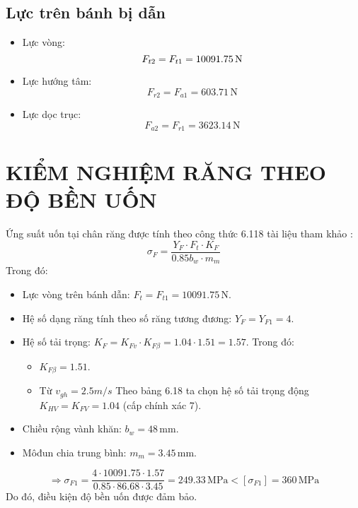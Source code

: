         \subsection{Lực trên bánh bị dẫn}
            \begin{itemize}
                \item Lực vòng: 
                    \begin{equation*}
                        F_{t2} = F_{t1} = 10091.75 \, \mathrm{N} \\
                    \end{equation*}
                \item Lực hướng tâm:
                    \begin{equation*}
                        F_{r2} = F_{a1} = 603.71  \, \mathrm{N}
                    \end{equation*}
                \item Lực dọc trục:
                    \begin{equation*}
                        F_{a2} = F_{r1} = 3623.14 \, \mathrm{N}
                    \end{equation*}
            \end{itemize}
    \section{KIỂM NGHIỆM RĂNG THEO ĐỘ BỀN UỐN}
        \hspace*{0.6cm}Ứng suất uốn tại chân răng được tính theo công thức 6.118 tài liệu tham khảo \cite{gtctm}:
        \begin{equation}
            \sigma_{F} = \frac{Y_{F} \cdot F_{t} \cdot K_{F}}{0.85b_{w} \cdot m_{m}}
            \label{eq:4.15}
        \end{equation}
        \hspace*{0.6cm}Trong đó:
        \begin{itemize}
            \item Lực vòng trên bánh dẫn: $F_{t} = F_{t1} = 10091.75 \, \mathrm{N}$.
            \item Hệ số dạng răng tính theo số răng tương đương: $Y_{F} = Y_{F1} = 4$.
            \item Hệ số tải trọng: $K_{F} = K_{Fv} \cdot K_{F\beta} = 1.04 \cdot 1.51 = 1.57$. Trong đó: 
            \begin{itemize}
                \item $K_{F\beta} = 1.51$.
                \item Từ $v_{gh} = 2.5 m/s$  Theo bảng 6.18 ta chọn hệ số tải trọng động $K_{HV} = K_{FV} = 1.04$ (cấp chính xác 7).
            \end{itemize}
            \item Chiều rộng vành khăn: $b_{w} = 48\, \mathrm{mm}$.
            \item Môđun chia trung bình: $m_{m} = 3.45 \, \mathrm{mm}$.
        \end{itemize}
        $$\Rightarrow\sigma_{F1} = \frac{4 \cdot 10091.75 \cdot 1.57}{0.85 \cdot 86.68 \cdot 3.45} = 249.33 \, \mathrm{MPa} < [\sigma_{F1}] = 360 \, \mathrm{MPa}$$
        \hspace*{0.6cm}Do đó, điều kiện độ bền uốn được đảm bảo.
